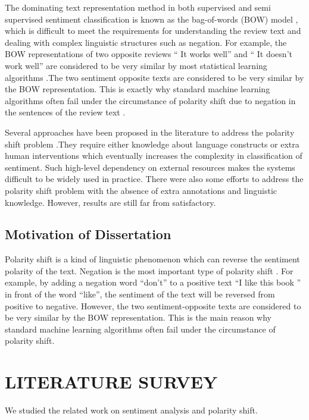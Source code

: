 \documentclass[oneside,a4paper,12pt]{pictreport}
\begin{document}
\par The dominating text representation method in
both supervised and 
semi supervised sentiment
classification is known as the bag-of-words (BOW)
model \cite{pang}, which is difficult to meet the requirements
for understanding the review text and dealing with
complex linguistic structures such as negation. For
example, the BOW representations of two opposite
reviews `` It works well'' and `` It doesn't work well''
are considered to be very similar by most statistical
learning algorithms \cite{yahoo}.The two sentiment opposite texts are considered to be very similar by the
BOW representation. This is exactly why standard machine learning algorithms often
fail under the circumstance of polarity shift due to negation in the sentences of the review text \cite{contrast} \cite{xiaOriginal}.

\par Several approaches have been proposed in the literature
to address the polarity shift problem .They require either knowledge about language constructs or
extra human interventions which eventually increases the complexity in classification of sentiment.  Such
high-level dependency on external resources makes the systems 
difficult to be widely used in practice. There were also
some efforts to address the polarity shift problem with the
absence of extra annotations and linguistic knowledge. However, results are still far from satisfactory.
\section{Motivation of Dissertation}
Polarity shift is a kind of linguistic phenomenon which can reverse the sentiment polarity of the text. Negation is
the most important type of polarity shift \cite{xiaOriginal}. For example, by adding a negation word ``don't'' to a positive text ``I like
this book '' in front of the word ``like'', the sentiment of the
text will be reversed from positive to negative. However, the two sentiment-opposite texts are considered to be
very similar by the BOW representation. This is the main reason why standard machine learning algorithms often
fail under the circumstance of polarity shift.


\chapter{LITERATURE SURVEY}

We studied the related work on sentiment analysis and
polarity shift.
\end{document}
